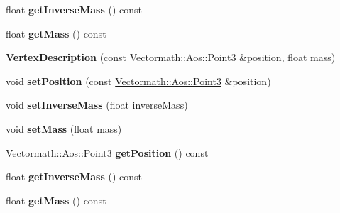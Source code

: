 \begin{DoxyCompactItemize}
\mbox{\label{classbtSoftBodyVertexData_1_1VertexDescription_a72d8e0cacbbaadec12ed976c83a7b3fe}} 
float {\bfseries get\+Inverse\+Mass} () const
\item 
\mbox{\label{classbtSoftBodyVertexData_1_1VertexDescription_a64cf4fdbcfa8e8be83687d82d19e023f}} 
float {\bfseries get\+Mass} () const
\item 
\mbox{\label{classbtSoftBodyVertexData_1_1VertexDescription_aedff609f8656322a5b0dbe7019cce12b}} 
{\bfseries Vertex\+Description} (const \hyperlink{classVectormath_1_1Aos_1_1Point3}{Vectormath\+::\+Aos\+::\+Point3} \&position, float mass)
\item 
\mbox{\label{classbtSoftBodyVertexData_1_1VertexDescription_a56f64e174dcd0a4118a776affabedf4a}} 
void {\bfseries set\+Position} (const \hyperlink{classVectormath_1_1Aos_1_1Point3}{Vectormath\+::\+Aos\+::\+Point3} \&position)
\item 
\mbox{\label{classbtSoftBodyVertexData_1_1VertexDescription_af1dd19f6c64c78883f8558c57acfdfca}} 
void {\bfseries set\+Inverse\+Mass} (float inverse\+Mass)
\item 
\mbox{\label{classbtSoftBodyVertexData_1_1VertexDescription_ace4e313f42951933eb855027f965e122}} 
void {\bfseries set\+Mass} (float mass)
\item 
\mbox{\label{classbtSoftBodyVertexData_1_1VertexDescription_a5e2189e93988d5285e6c51ba8626f073}} 
\hyperlink{classVectormath_1_1Aos_1_1Point3}{Vectormath\+::\+Aos\+::\+Point3} {\bfseries get\+Position} () const
\item 
\mbox{\label{classbtSoftBodyVertexData_1_1VertexDescription_a72d8e0cacbbaadec12ed976c83a7b3fe}} 
float {\bfseries get\+Inverse\+Mass} () const
\item 
\mbox{\label{classbtSoftBodyVertexData_1_1VertexDescription_a64cf4fdbcfa8e8be83687d82d19e023f}} 
float {\bfseries get\+Mass} () const
\end{DoxyCompactItemize}


